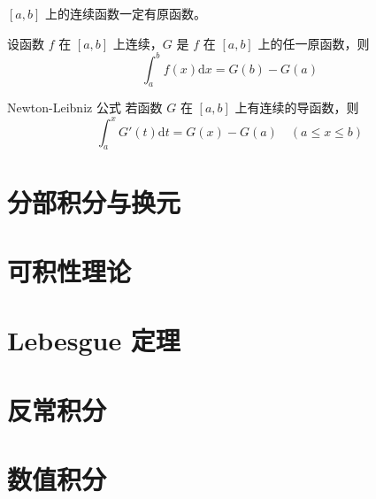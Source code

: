 \begin{corollary}
  $[a,b]$ 上的连续函数一定有原函数。
\end{corollary}

\begin{theorem}
  设函数 $f$ 在 $[a,b]$ 上连续，$G$ 是 $f$ 在 $[a,b]$ 上的任一原函数，则
  \[\int_{a}^{b}f(x)\mathrm{d}x = G(b) - G(a)\]
\end{theorem}

\begin{theorem}{Newton-Leibniz 公式}
  若函数 $G$ 在 $[a,b]$ 上有连续的导函数，则
  \[\int_{a}^{x}G'(t)\mathrm{d}t = G(x) - G(a)\quad (a \leqslant x \leqslant b)\]
\end{theorem}


\section{分部积分与换元}







\section{可积性理论}







\section{Lebesgue 定理}







\section{反常积分}







\section{数值积分}






